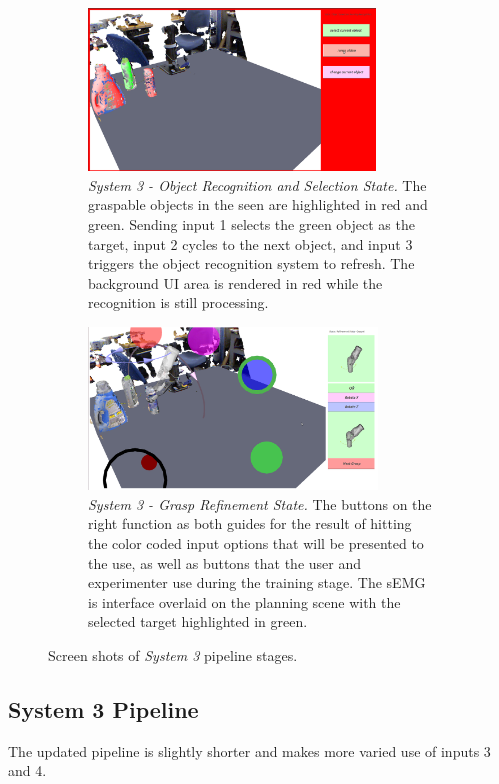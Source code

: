 \begin{figure}
\centering
\begin{subfigure}[t]{\columnwidth}
\centering
\includegraphics[height=1.7in,width=.99\columnwidth]{images_4/object_recognition_state.png}
\caption{\emph{System 3 - Object Recognition and Selection State.} The graspable objects in the seen are highlighted in red and green. Sending input 1 selects the green object as the target, input 2 cycles to the next object, and input 3 triggers the object recognition system to refresh.   The background UI area is rendered in red while the recognition is still processing.}
\label{fig:ui-4-object-selection}
\end{subfigure}
\begin{subfigure}[t]{\columnwidth}
\centering
\includegraphics[height=1.7in,width=.99\columnwidth]{images_4/matlab_ui.png}
\caption{\emph{System 3 - Grasp Refinement State.} The buttons on the right function as both guides for the result of hitting the color coded input options that will be presented to the use, as well as buttons that the user and experimenter use during the training stage. The sEMG is interface overlaid on the planning scene with the selected target highlighted in green.}
\label{fig:ui-4-total-a}
\end{subfigure}
\caption{Screen shots of \emph{System 3} pipeline stages.}
\label{fig:ui-4-snapshots}
\end{figure}

\subsection{System 3 Pipeline}
The updated pipeline is slightly shorter and makes more varied use of inputs 3 and 4. 

